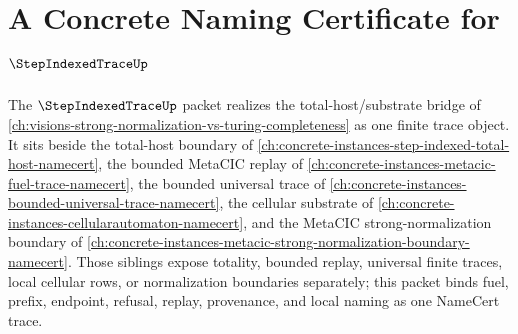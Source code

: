 \chapter{A Concrete Naming Certificate for $\StepIndexedTraceUp$}
\label{ch:concrete-instances-step-indexed-trace-namecert}

The $\StepIndexedTraceUp$ packet realizes the total-host/substrate bridge of \autoref{ch:visions-strong-normalization-vs-turing-completeness} as one finite trace object. It sits beside the total-host boundary of \autoref{ch:concrete-instances-step-indexed-total-host-namecert}, the bounded MetaCIC replay of \autoref{ch:concrete-instances-metacic-fuel-trace-namecert}, the bounded universal trace of \autoref{ch:concrete-instances-bounded-universal-trace-namecert}, the cellular substrate of \autoref{ch:concrete-instances-cellularautomaton-namecert}, and the MetaCIC strong-normalization boundary of \autoref{ch:concrete-instances-metacic-strong-normalization-boundary-namecert}. Those siblings expose totality, bounded replay, universal finite traces, local cellular rows, or normalization boundaries separately; this packet binds fuel, prefix, endpoint, refusal, replay, provenance, and local naming as one NameCert trace.

